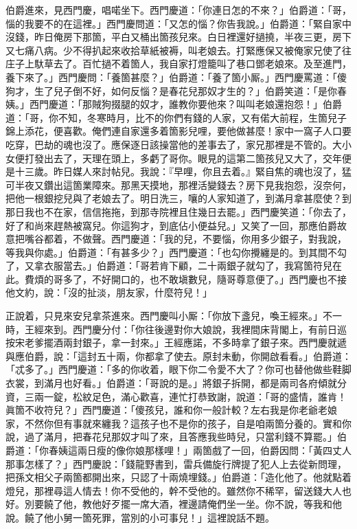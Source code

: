 伯爵進來，見西門慶，唱喏坐下。西門慶道：「你連日怎的不來？」伯爵道：「哥，惱的我要不的在這裡。」西門慶問道：「又怎的惱？你告我說。」伯爵道：「緊自家中沒錢，昨日俺房下那箇，平白又桶出箇孩兒來。白日裡還好撾撓，半夜三更，房下又七痛八病。少不得扒起來收拾草紙被褥，叫老娘去。打緊應保又被俺家兄使了往庄子上馱草去了。百忙撾不着箇人，我自家打燈籠叫了巷口鄧老娘來。及至進門，養下來了。」西門慶問：「養箇甚麼？」伯爵道：「養了箇小厮。」西門慶罵道：「傻狗才，生了兒子倒不好，如何反惱？是春花兒那奴才生的？」伯爵笑道：「是你春姨。」西門慶道：「那賊狗掇腿的奴才，誰教你要他來？叫叫老娘還抱怨！」伯爵道：「哥，你不知，冬寒時月，比不的你們有錢的人家，又有偌大前程，生箇兒子錦上添花，便喜歡。俺們連自家還多着箇影兒哩，要他做甚麼！家中一窩子人口要吃穿，巴劫的魂也沒了。應保逐日該操當他的差事去了，家兄那裡是不管的。大小女便打發出去了，天理在頭上，多虧了哥你。{}眼見的這第二箇孩兒又大了，交年便是十三歲。昨日媒人來討帖兒。我說：『早哩，你且去着。』緊自焦的魂也沒了，猛可半夜又鑽出這箇業障來。那黑天摸地，那裡活變錢去？房下見我抱怨，沒奈何，把他一根銀挖兒與了老娘去了。{}明日洗三，嚷的人家知道了，到滿月拿甚麼使？到那日我也不在家，信信拖拖，到那寺院裡且住幾日去罷。」{}西門慶笑道：「你去了，好了和尚來趕熱被窩兒。你這狗才，到底佔小便益兒。」又笑了一回，那應伯爵故意把嘴谷都着，{}不做聲。{}西門慶道：「我的兒，不要惱，你用多少銀子，對我說，等我與你處。」伯爵道：「有甚多少？」西門慶道：「也勾你攪纏是的。到其間不勾了，又拿衣服當去。」伯爵道：「哥若肯下顧，二十兩銀子就勾了，我寫箇符兒在此。費煩的哥多了，不好開口的，也不敢塡數兒，隨哥尊意便了。」西門慶也不接他文約，說：「沒的扯淡，朋友家，什麼符兒！」

正說着，只見來安兒拿茶進來。西門慶叫小厮：「你放下盞兒，喚王經來。」不一時，王經來到。西門慶分付：「你往後邊對你大娘說，我裡間床背閣上，有前日巡按宋老爹擺酒兩封銀子，拿一封來。」王經應諾，不多時拿了銀子來。西門慶就遞與應伯爵，說：「這封五十兩，你都拿了使去。{}原封未動，你開啟看看。」伯爵道：「忒多了。」西門慶道：「多的你收着，眼下你二令愛不大了？你可也替他做些鞋脚衣裳，到滿月也好看。」伯爵道：「哥說的是。」將銀子拆開，都是兩司各府傾就分資，三兩一錠，松紋足色，滿心歡喜，連忙打恭致謝，說道：「哥的盛情，誰肯！眞箇不收符兒？」西門慶道：「傻孩兒，誰和你一般計較？左右我是你老爺老娘家，不然你但有事就來纏我？這孩子也不是你的孩子，自是咱兩箇分養的。實和你說，過了滿月，把春花兒那奴才叫了來，且答應我些時兒，只當利錢不算罷。」伯爵道：「你春姨這兩日瘦的像你娘那樣哩！」兩箇戲了一回，伯爵因問：「黃四丈人那事怎樣了？」西門慶說：「錢龍野書到，雷兵備旋行牌提了犯人上去從新問理，把孫文相父子兩箇都開出來，只認了十兩燒埋錢。」伯爵道：「造化他了。他就點着燈兒，那裡尋這人情去！你不受他的，幹不受他的。雖然你不稀罕，留送錢大人也好。別要饒了他，教他好歹擺一席大酒，裡邊請俺們坐一坐。你不說，等我和他說。饒了他小舅一箇死罪，當別的小可事兒！」這裡說話不題。

